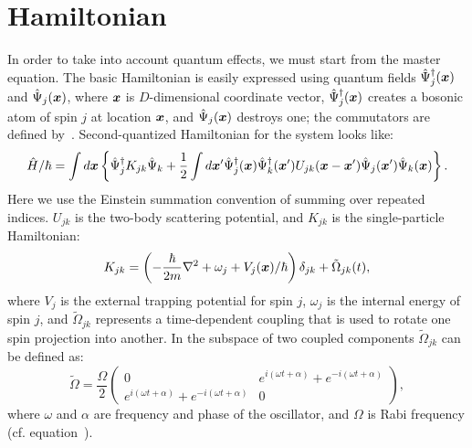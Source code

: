\section{Hamiltonian}

In order to take into account quantum effects, we must start from the master equation.
The basic Hamiltonian is easily expressed using quantum fields $\hat{\Psi}_j^{\dagger}(\boldsymbol{x})$ and $\hat{\Psi}_j(\boldsymbol{x})$,
where $\boldsymbol{x}$ is $D$-dimensional coordinate vector,
$\hat{\Psi}_j^{\dagger}(\boldsymbol{x})$ creates a bosonic atom of spin $j$ at location $\boldsymbol{x}$,
and $\hat{\Psi}_j(\boldsymbol{x})$ destroys one;
the commutators are defined by~.
Second-quantized Hamiltonian for the system looks like:
\begin{equation}
\label{eqn:wigner-bec:hamiltonian:H}
\begin{split}
	\hat{H} / \hbar = \int d\boldsymbol{x} \left\{
		\hat{\Psi}_j^{\dagger} K_{jk} \hat{\Psi}_k
		+ \frac{1}{2} \int d\boldsymbol{x}^\prime
			\hat{\Psi}_j^\dagger (\boldsymbol{x}) \hat{\Psi}_k^\dagger (\boldsymbol{x}^\prime)
			U_{jk}(\boldsymbol{x} - \boldsymbol{x}^\prime)
			\hat{\Psi}_j (\boldsymbol{x}^\prime) \hat{\Psi}_k (\boldsymbol{x})
	\right\}.
\end{split}
\end{equation}
Here we use the Einstein summation convention of summing over repeated indices.
$U_{jk}$ is the two-body scattering potential, and $K_{jk}$ is the single-particle Hamiltonian:
\begin{equation}
	K_{jk} = \left(
			-\frac{\hbar}{2m} \nabla^2 + \omega_j + V_j(\boldsymbol{x}) / \hbar
		\right) \delta_{jk}
		+ \tilde{\Omega}_{jk}(t),
\end{equation}
where $V_j$ is the external trapping potential for spin $j$,
$\omega_j$ is the internal energy of spin $j$,
and $\tilde{\Omega}_{jk}$ represents a time-dependent coupling that is used to rotate one spin projection into another.
In the subspace of two coupled components $\tilde{\Omega}_{jk}$ can be defined as:
\[
	\tilde{\Omega} = \frac{\Omega}{2} \begin{pmatrix}
		0 & e^{i(\omega t + \alpha)} + e^{-i(\omega t + \alpha)} \\
		e^{i (\omega t + \alpha)} + e^{-i(\omega t + \alpha)} & 0
	\end{pmatrix},
\]
where $\omega$ and $\alpha$ are frequency and phase of the oscillator,
and $\Omega$ is Rabi frequency (cf. equation~).

